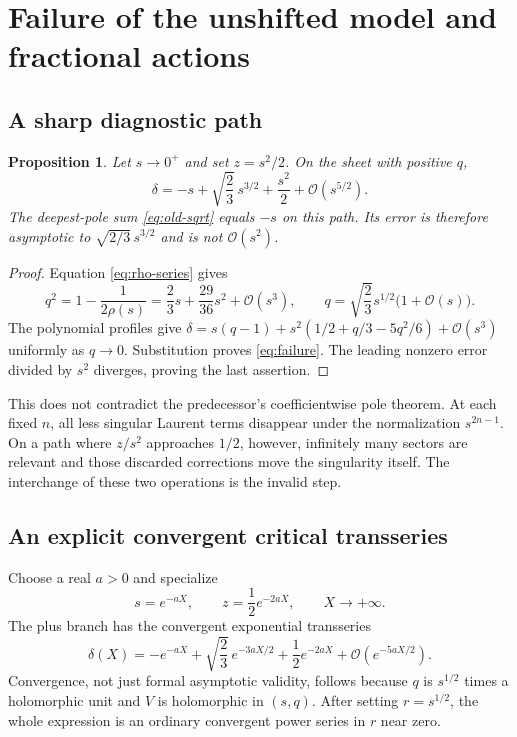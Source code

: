 \documentclass[11pt,a4paper]{article}
\newtheorem{proposition}[theorem]{Proposition}
\theoremstyle{definition}
\theoremstyle{remark}
\newcommand{\OO}{\mathcal O}
\begin{document}
\section{Failure of the unshifted model and fractional actions}
\label{sec:failure}

\subsection{A sharp diagnostic path}
\begin{proposition}\label{prop:failure}
Let $s\to0^+$ and set $z=s^2/2$. On the sheet with positive $q$,
\begin{equation}\label{eq:failure}
 \delta=-s+\sqrt{\frac23}\,s^{3/2}+\frac{s^2}{2}
                        +\OO(s^{5/2}).
\end{equation}
The deepest-pole sum \eqref{eq:old-sqrt} equals $-s$ on this path.
Its error is therefore asymptotic to $\sqrt{2/3}\,s^{3/2}$ and is not
$\OO(s^2)$.
\end{proposition}
\begin{proof}
Equation \eqref{eq:rho-series} gives
\[
 q^2=1-\frac1{2\rho(s)}
       =\frac23s+\frac{29}{36}s^2+\OO(s^3),
 \qquad
 q=\sqrt{\frac23}s^{1/2}\bigl(1+\OO(s)\bigr).
\]
The polynomial profiles give
$\delta=s(q-1)+s^2(1/2+q/3-5q^2/6)+\OO(s^3)$ uniformly as $q\to0$.
Substitution proves \eqref{eq:failure}. The leading nonzero error divided
by $s^2$ diverges, proving the last assertion.
\end{proof}

This does not contradict the predecessor's coefficientwise pole theorem.
At each fixed $n$, all less singular Laurent terms disappear under the
normalization $s^{2n-1}$. On a path where $z/s^2$ approaches $1/2$, however,
infinitely many sectors are relevant and those discarded corrections move
the singularity itself. The interchange of these two operations is the
invalid step.

\subsection{An explicit convergent critical transseries}
Choose a real $a>0$ and specialize
\[
 s=e^{-aX},\qquad z=\frac12e^{-2aX},\qquad X\to+\infty.
\]
The plus branch has the convergent exponential transseries
\begin{equation}\label{eq:half-action}
 \delta(X)=-e^{-aX}+\sqrt{\frac23}\,e^{-3aX/2}
                       +\frac12e^{-2aX}+\OO(e^{-5aX/2}).
\end{equation}
Convergence, not just formal asymptotic validity, follows because $q$ is
$s^{1/2}$ times a holomorphic unit and $V$ is holomorphic in $(s,q)$.
After setting $r=s^{1/2}$, the whole expression is an ordinary convergent
power series in $r$ near zero.
\end{document}
